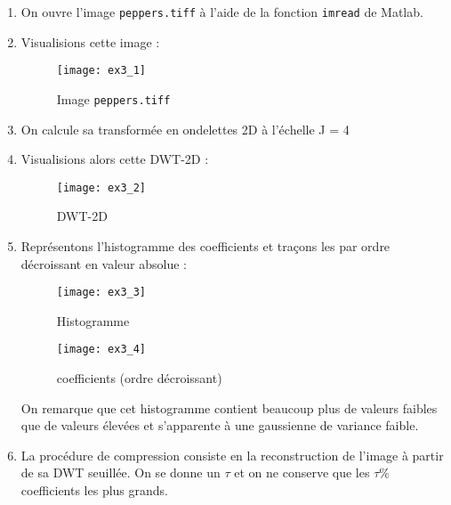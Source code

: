 \documentclass[12pt,a4paper,titlepage]{article}
\begin{document}
    \begin{enumerate}

        \item{On ouvre l'image \texttt{peppers.tiff} à l'aide de la fonction
                \texttt{imread} de Matlab.
            }

        \item{
                Visualisions cette image :

                \begin{figure}[H]
                    \caption{Image \texttt{peppers.tiff}}
                    \texttt{[image: ex3\_1]}
                    \centering
                \end{figure}
            }

        \item{On calcule sa transformée en ondelettes 2D à l'échelle J = 4}

        \item{Visualisions alors cette DWT-2D :

                \begin{figure}[H]
                    \caption{DWT-2D}
                    \texttt{[image: ex3\_2]}
                    \centering
                \end{figure}
            }

        \item{Représentons l'histogramme des coefficients et traçons les par
                ordre décroissant en valeur absolue :

                \begin{figure}[H]
                    \caption{Histogramme}
                    \texttt{[image: ex3\_3]}
                    \centering
                \end{figure}

                \begin{figure}[H]
                    \caption{coefficients (ordre décroissant)}
                    \texttt{[image: ex3\_4]}
                    \centering
                \end{figure}

                On remarque que cet histogramme contient beaucoup plus de valeurs faibles que
                de valeurs élevées et s'apparente à une gaussienne de variance faible.

            }

        \item{{La procédure de compression consiste en la reconstruction de l'image à partir de sa DWT
                seuillée. On se donne un $\tau$ et on ne conserve que les $\tau \%$ coefficients
                les plus grands.
            }

}
\end{enumerate}
\end{document}
